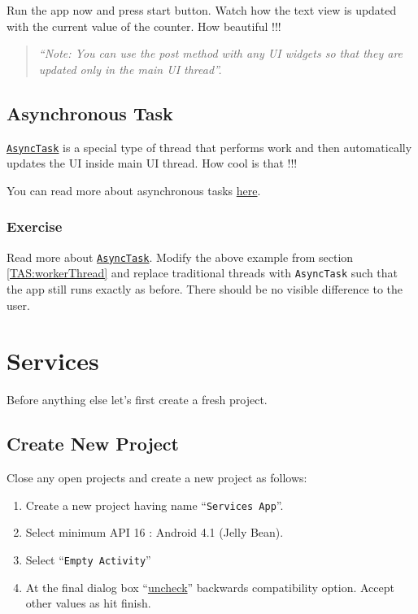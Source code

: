 Run the app now and press start button. Watch how the text view is updated with the current value of the counter. How beautiful !!!

\begin{quote}
	\textit{``Note: You can use the post method with any UI widgets so that they are updated only in the main UI thread''.}
\end{quote}

\subsection{Asynchronous Task}
\label{TAS:asyncTask}
\href{https://developer.android.com/reference/android/os/AsyncTask.html}{\texttt{AsyncTask}} is a special type of thread that performs work and then automatically updates the UI inside main UI thread. How cool is that !!!

You can read more about asynchronous tasks \href{https://developer.android.com/reference/android/os/AsyncTask.html}{here}.

\subsubsection{Exercise}
Read more about \href{https://developer.android.com/reference/android/os/AsyncTask.html}{\texttt{AsyncTask}}. Modify the above example from section \ref{TAS:workerThread} and replace traditional threads with \texttt{AsyncTask} such that the app still runs exactly as before. There should be no visible difference to the user.

\section{Services}
\label{TAS:services}
Before anything else let's first create a fresh project.

\subsection{Create New Project}
\label{TAS:createNewProject}
Close any open projects and create a new project as follows:
\begin{enumerate}
	\item Create a new project having name ``\texttt{Services App}''.
	\item Select minimum API 16 : Android 4.1 (Jelly Bean).
	\item Select ``\texttt{Empty Activity}''
	\item At the final dialog box ``\underline{uncheck}'' backwards compatibility option. Accept other values as hit finish.
\end{enumerate}	

